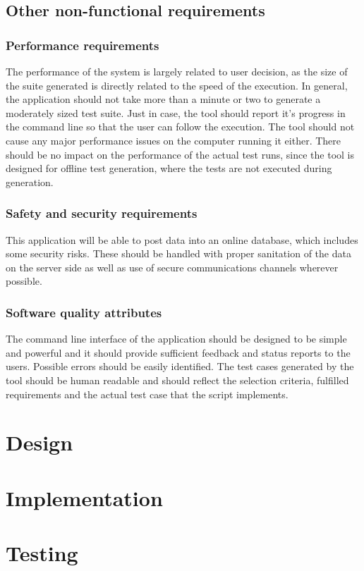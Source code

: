 \subsection{Other non-functional requirements}

\subsubsection{Performance requirements}
The performance of the system is largely related to user decision, as the size of the suite generated is directly related to the speed of the execution. In general, the application should not take more than a minute or two to generate a moderately sized test suite. Just in case, the tool should report it's progress in the command line so that the user can follow the execution. The tool should not cause any major performance issues on the computer running it either. There should be no impact on the performance of the actual test runs, since the tool is designed for offline test generation, where the tests are not executed during generation.

\subsubsection{Safety and security requirements}
This application will be able to post data into an online database, which includes some security risks. These should be handled with proper sanitation of the data on the server side as well as use of secure communications channels wherever possible.

\subsubsection{Software quality attributes}
The command line interface of the application should be designed to be simple and powerful and it should provide sufficient feedback and status reports to the users. Possible errors should be easily identified. The test cases generated by the tool should be human readable and should reflect the selection criteria, fulfilled requirements and the actual test case that the script implements.

\section{Design}

\section{Implementation}

\section{Testing}